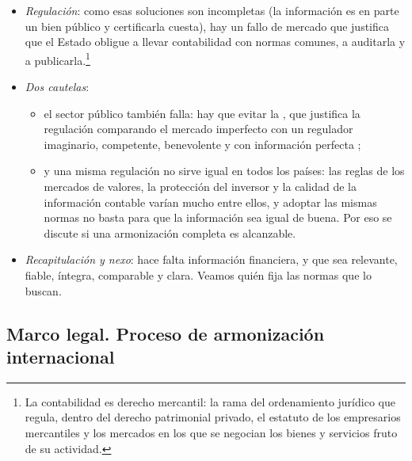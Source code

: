 \documentclass[11pt]{article}
\begin{document}
\begin{itemize}
\item \emph{Regulación}: como esas soluciones son incompletas (la información es en parte un bien público y certificarla cuesta), hay un fallo de mercado que justifica que el Estado obligue a llevar contabilidad con normas comunes, a auditarla y a publicarla.\footnote{La contabilidad es derecho mercantil: la rama del ordenamiento jurídico que regula, dentro del derecho patrimonial privado, el estatuto de los empresarios mercantiles y los mercados en los que se negocian los bienes y servicios fruto de su actividad.}
\item \emph{Dos cautelas}:
  \begin{itemize}
  \item el sector público también falla: hay que evitar la , que justifica la regulación comparando el mercado imperfecto con un regulador imaginario, competente, benevolente y con información perfecta \nocite{Demsetz1969Information};
  \item y una misma regulación no sirve igual en todos los países: las reglas de los mercados de valores, la protección del inversor y la calidad de la información contable varían mucho entre ellos, y adoptar las mismas normas no basta para que la información sea igual de buena. Por eso se discute si una armonización completa es alcanzable\nocite{Ball2006IFRS,LeuzWysocki2016Economics}.
  \end{itemize}
\item \emph{Recapitulación y nexo}: hace falta información financiera, y que sea relevante, fiable, íntegra, comparable y clara. Veamos quién fija las normas que lo buscan.
\end{itemize}

\subsection{Marco legal. Proceso de armonización internacional}\label{sec:marco-legal}
\end{document}
